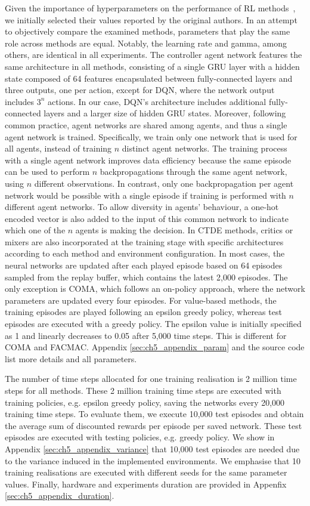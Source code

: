 Given the importance of hyperparameters on the performance of RL methods~\citep{gorsane2022towards}, we initially selected their values reported by the original authors.
In an attempt to objectively compare the examined methods, parameters that play the same role across methods are equal.
Notably, the learning rate and gamma, among others, are identical in all experiments.
The controller agent network features the same architecture in all methods, consisting of a single GRU layer with a hidden state composed of 64 features encapsulated between fully-connected layers and three outputs, one per action, except for DQN, where the network output includes $3^n$ actions.
In our case, DQN's architecture includes additional fully-connected layers and a larger size of hidden GRU states.
Moreover, following common practice, agent networks are shared among agents, and thus a single agent network is trained.
Specifically, we train only one network that is used for all agents, instead of training $n$ distinct agent networks.
The training process with a single agent network improves data efficiency because the same episode can be used to perform $n$ backpropagations through the same agent network, using $n$ different observations.
In contrast, only one backpropagation per agent network would be possible with a single episode if training is performed with $n$ different agent networks.
To allow diversity in agents' behaviour, a one-hot encoded vector is also added to the input of this common network to indicate which one of the $n$ agents is making the decision.
In CTDE methods, critics or mixers are also incorporated at the training stage with specific architectures according to each method and environment configuration.
In most cases, the neural networks are updated after each played episode based on 64 episodes sampled from the replay buffer, which contains the latest 2,000 episodes.
The only exception is COMA, which follows an on-policy approach, where the network parameters are updated every four episodes.
For value-based methods, the training episodes are played following an epsilon greedy policy, whereas test episodes are executed with a greedy policy.
The epsilon value is initially specified as 1 and linearly decreases to 0.05 after 5,000 time steps.
This is different for COMA and FACMAC. 
Appendix \ref{sec:ch5_appendix_param} and the source code list more details and all parameters.

The number of time steps allocated for one training realisation is 2 million time steps for all methods.
These 2 million training time steps are executed with training policies, e.g. epsilon greedy policy, saving the networks every 20,000 training time steps.
To evaluate them, we execute 10,000 test episodes and obtain the average sum of discounted rewards per episode per saved network.
These test episodes are executed with testing policies, e.g. greedy policy.
We show in Appendix \ref{sec:ch5_appendix_variance} that 10,000 test episodes are needed due to the variance induced in the implemented environments.
We emphasise that 10 training realisations are executed with different seeds for the same parameter values.
Finally, hardware and experiments duration are provided in Appenfix \ref{sec:ch5_appendix_duration}.

